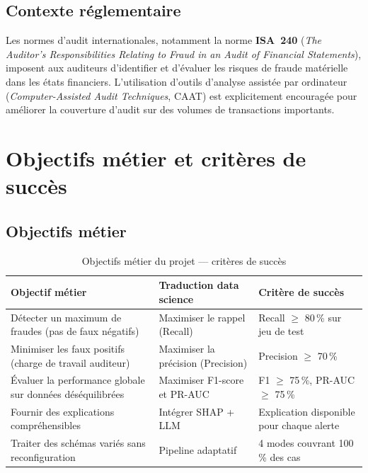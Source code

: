 \documentclass[12pt,a4paper,twoside]{report}
\theoremstyle{definition}
\begin{document}
\subsection{Contexte réglementaire}

Les normes d'audit internationales, notamment la norme \textbf{ISA~240}
(\textit{The Auditor's Responsibilities Relating to Fraud in an Audit of Financial
Statements}), imposent aux auditeurs d'identifier et d'évaluer les risques de
fraude matérielle dans les états financiers. L'utilisation d'outils d'analyse
assistée par ordinateur (\textit{Computer-Assisted Audit Techniques}, CAAT) est
explicitement encouragée pour améliorer la couverture d'audit sur des volumes
de transactions importants.

\section{Objectifs métier et critères de succès}

\subsection{Objectifs métier}

\begin{table}[H]
\centering
\caption{Objectifs métier du projet — critères de succès}
\label{tab:business_objectives}
\renewcommand{\arraystretch}{1.3}
\begin{tabularx}{\textwidth}{L{4cm}L{4cm}L{5cm}}
\toprule
\textbf{Objectif métier} & \textbf{Traduction data science} & \textbf{Critère de succès} \\
\midrule
Détecter un maximum de fraudes (pas de faux négatifs) & Maximiser le rappel (Recall) & Recall $\geq$ 80\,\% sur jeu de test \\
Minimiser les faux positifs (charge de travail auditeur) & Maximiser la précision (Precision) & Precision $\geq$ 70\,\% \\
Évaluer la performance globale sur données déséquilibrées & Maximiser F1-score et PR-AUC & F1 $\geq$ 75\,\%, PR-AUC $\geq$ 75\,\% \\
Fournir des explications compréhensibles & Intégrer SHAP + LLM & Explication disponible pour chaque alerte \\
Traiter des schémas variés sans reconfiguration & Pipeline adaptatif & 4 modes couvrant 100\,\% des cas \\
\bottomrule
\end{tabularx}
\end{table}
\end{document}
